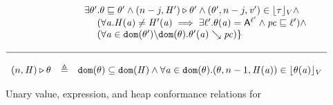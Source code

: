 \begin{figure*}[!htbp]
\begin{displaymath}
\begin{array}{lll}
                 &    & ~~\exists \theta'. \theta \sqsubseteq \theta' \wedge
                        (n-j, \mathit{H}') \overset{}\triangleright \theta' \wedge
                        (\theta', n-j, \mathit{v}') \in \lfloor \tau \rfloor_{V} \wedge \\
                 &   &  ~~~~~~(\forall \mathit{a}. \mathit{H}(\mathit{a}) \neq \mathit{H}'(\mathit{a}) \implies
                        \exists \ell'. \theta(\mathit{a}) = \mathsf{A}^{\ell'} \wedge \mathit{pc} \sqsubseteq \ell'
                        ) \wedge\\
                 &    &  ~~~~~~ (\forall \mathit{a} \in \mathtt{dom}(\theta') \backslash \mathtt{dom}(\theta). \theta'(\mathit{a}) \searrow \mathit{pc})
                        \}\\ \\
\hline \\
    (n,\mathit{H}) \overset{}\triangleright \theta & \triangleq & \mathtt{dom}(\theta) \subseteq \mathtt{dom}(\mathit{H}) \wedge
                                            \forall \mathit{a} \in \mathtt{dom}(\theta). (\theta, n-1, \mathit{H}(\mathit{a})) \in
                                            \lfloor \theta(\mathit{a}) \rfloor_{V}
  \end{array}
\end{displaymath}
\caption{Unary value, expression, and heap conformance relations for {\fg}}
\label{fig:ulr-fg}
\end{figure*}


